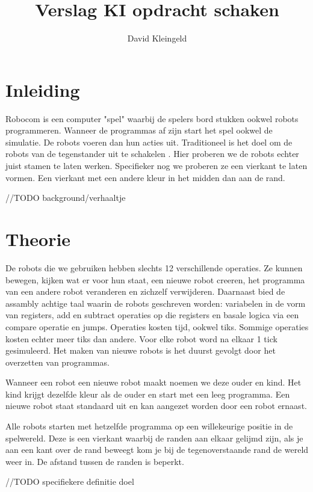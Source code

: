 \documentclass[10pt]{article}
\author{David Kleingeld}
\title{Verslag KI opdracht schaken }
\begin{document}

\maketitle

\section{Inleiding}

Robocom is een computer "spel" waarbij de spelers bord stukken ookwel robots programmeren. Wanneer de programmas af zijn start het spel ookwel de simulatie. De robots voeren dan hun acties uit. Traditioneel is het doel om de robots van de tegenstander uit te schakelen \cite{robocom}. Hier proberen we de robots echter juist stamen te laten werken. Specifieker nog we proberen ze een vierkant te laten vormen. Een vierkant met een andere kleur in het midden dan aan de rand.

//TODO background/verhaaltje

\section{Theorie}

De robots die we gebruiken hebben slechts 12 verschillende operaties. Ze kunnen bewegen, kijken wat er voor hun staat, een nieuwe robot creeren, het programma van een andere robot veranderen en zichzelf verwijderen. Daarnaast bied de assambly achtige taal waarin de robots geschreven worden: variabelen in de vorm van registers, add en subtract operaties op die registers en basale logica via een compare operatie en jumps. Operaties kosten tijd, ookwel tiks. Sommige operaties kosten echter meer tiks dan andere. Voor elke robot word na elkaar 1 tick gesimuleerd. Het maken van nieuwe robots is het duurst gevolgt door het overzetten van programmas.

Wanneer een robot een nieuwe robot maakt noemen we deze ouder en kind. Het kind krijgt dezelfde kleur als de ouder en start met een leeg programma. Een nieuwe robot staat standaard uit en kan aangezet worden door een robot ernaast. 

Alle robots starten met hetzelfde programma op een willekeurige positie in de spelwereld. Deze is een vierkant waarbij de randen aan elkaar gelijmd zijn, als je aan een kant over de rand beweegt kom je bij de tegenoverstaande rand de wereld weer in. De afstand tussen de randen is beperkt.

//TODO specifiekere definitie doel
\end{document}

